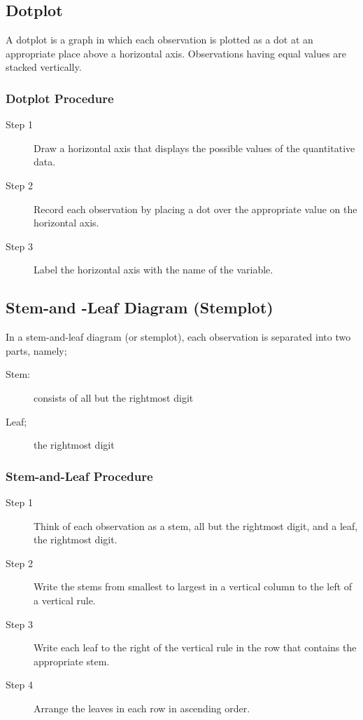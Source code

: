 \documentclass[12pt]{article}
\begin{document}
        \subsection*{Dotplot}
            A dotplot is a graph in which each observation is plotted as a dot at an
            appropriate place above a horizontal axis. Observations having equal values
            are stacked vertically.
            \subsubsection*{Dotplot Procedure}
                \begin{description}
                    \item[Step 1] Draw a horizontal axis that displays the possible values
                    of the quantitative data.
                    \item[Step 2] Record each observation by placing a dot over the
                    appropriate value on the horizontal axis.
                    \item[Step 3] Label the horizontal axis with the name of the variable.
                \end{description}
        \subsection*{Stem-and -Leaf Diagram (Stemplot)}
            In a stem-and-leaf diagram (or stemplot), each observation is separated into
            two parts, namely;
            \begin{description}
                \item[Stem:] consists of all but the rightmost digit
                \item[Leaf;] the rightmost digit
            \end{description}
            \subsubsection*{Stem-and-Leaf Procedure}
                \begin{description}
                    \item[Step 1] Think of each observation as a stem, all but the
                    rightmost digit, and a leaf, the rightmost digit.
                    \item[Step 2] Write the stems from smallest to largest in a vertical
                    column to the left of a vertical rule.
                    \item[Step 3] Write each leaf to the right of the vertical rule in the
                    row that contains the appropriate stem.   
                    \item[Step 4] Arrange the leaves in each row in ascending order.
                \end{description}
            
\end{document}
